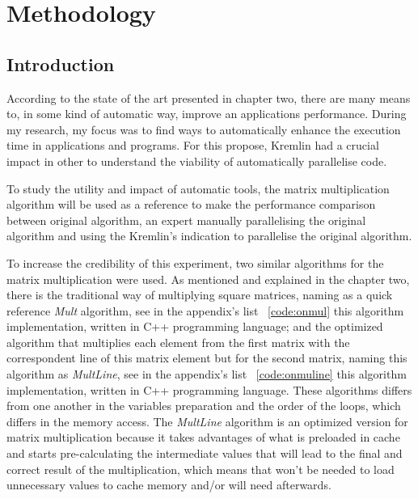 \chapter{Methodology}\label{chap:chap4}

\section*{}



\section{Introduction}

According to the state of the art presented in chapter two, there are many means to, in some kind of automatic way, improve an applications performance. During my research, my focus was to find ways to automatically enhance the execution time in applications and programs. For this propose, Kremlin had a crucial impact in other to understand the viability of automatically parallelise code.

To study the utility and impact of automatic tools, the matrix multiplication algorithm will be used as a reference to make the performance comparison between original algorithm, an expert manually parallelising the original algorithm and using the Kremlin's indication to parallelise the original algorithm.

To increase the credibility of this experiment, two similar algorithms for the matrix multiplication were used. As mentioned and explained in the chapter two, there is the traditional way of multiplying square matrices, naming as a quick reference \textit{Mult} algorithm, see in the appendix's list ~\ref{code:onmul} this algorithm implementation, written in C++ programming language; and the optimized algorithm that multiplies each element from the first matrix with the correspondent line of this matrix element but for the second matrix, naming this algorithm as \textit{MultLine}, see in the appendix's list ~\ref{code:onmuline} this algorithm implementation, written in C++ programming language. These algorithms differs from one another in the variables preparation and the order of the loops, which differs in the memory access. The \textit{MultLine} algorithm is an optimized version for matrix multiplication because it takes advantages of what is preloaded in cache and starts pre-calculating the intermediate values that will lead to the final and correct result of the multiplication, which means that won't be needed to load unnecessary values to cache memory and/or will need afterwards.  

